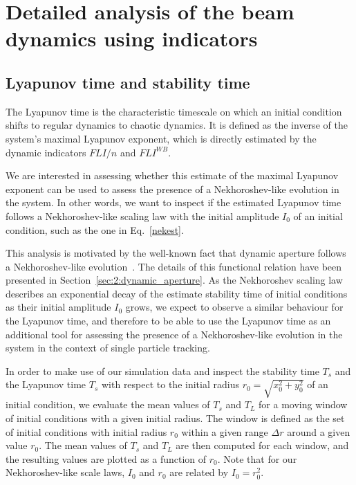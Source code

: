 \section{Detailed analysis of the beam dynamics using indicators}

\subsection{Lyapunov time and stability time}

The Lyapunov time is the characteristic timescale on which an initial condition shifts to regular dynamics to chaotic dynamics. It is defined as the inverse of the system's maximal Lyapunov exponent, which is directly estimated by the dynamic indicators $FLI/n$ and $FLI^{{WB}}$.

We are interested in assessing whether this estimate of the maximal Lyapunov exponent can be used to assess the presence of a Nekhoroshev-like evolution in the system. In other words, we want to inspect if the estimated Lyapunov time follows a Nekhoroshev-like scaling law with the initial amplitude $I_0$ of an initial condition, such as the one in Eq.~\eqref{nekest}.

This analysis is motivated by the well-known fact that dynamic aperture follows a Nekhoroshev-like evolution~\cite{Bazzani:2019csk}. The details of this functional relation have been presented in Section~\ref{sec:2:dynamic_aperture}. As the Nekhoroshev scaling law describes an exponential decay of the estimate stability time of initial conditions as their initial amplitude $I_0$ grows, we expect to observe a similar behaviour for the Lyapunov time, and therefore to be able to use the Lyapunov time as an additional tool for assessing the presence of a Nekhoroshev-like evolution in the system in the context of single particle tracking.

In order to make use of our simulation data and inspect the stability time $T_s$ and the Lyapunov time $T_s$ with respect to the initial radius $r_0 = \sqrt{x_0^2 + y_0^2}$ of an initial condition, we evaluate the mean values of $T_s$ and $T_L$ for a moving window of initial conditions with a given initial radius. The window is defined as the set of initial conditions with initial radius $r_0$ within a given range $\Delta r$ around a given value $r_0$. The mean values of $T_s$ and $T_L$ are then computed for each window, and the resulting values are plotted as a function of $r_0$. Note that for our Nekhoroshev-like scale laws, $I_0$ and $r_0$ are related by $I_0 = r_0^2$.

